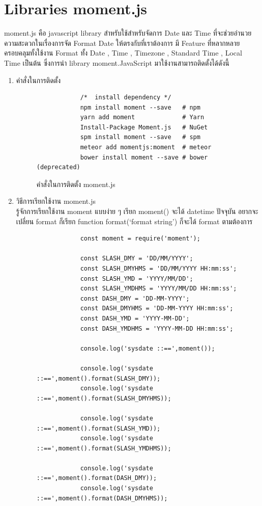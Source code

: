 \section{Libraries moment.js}
moment.js คือ javascript library สำหรับใช้สำหรับจัดการ Date และ Time ที่จะช่วยอำนวยความสะดวกในเรื่องการจัด Format Date ให้ตรงกับที่เราต้องการ
มี Feature ที่หลากหลายครอบคลุมทั้งใช้งาน Format ทั้ง Date , Time , Timezone , Standard Time , Local Time เป็นต้น ซึ่งการนำ library moment.JavaScript 
มาใช้งานสามารถติดตั้งได้ดังนี้
\begin{enumerate}
	\item คำสั่งในการติดตั้ง
	\begin{figure}[H]
		{\begin{lstlisting}
			/*  install dependency */
			npm install moment --save   # npm
			yarn add moment             # Yarn
			Install-Package Moment.js   # NuGet
			spm install moment --save   # spm
			meteor add momentjs:moment  # meteor
			bower install moment --save # bower (deprecated)
		\end{lstlisting}}
	\centering
		\caption{คำสั่งในการติดตั้ง moment.js}
		\label{Fig:API Web Speech}
	\end{figure}
	\item วิธีการเรียกใช้งาน moment.js \\ รู้จักการเรียกใช้งาน moment แบบง่าย ๆ เรียก moment() จะได้ datetime ปัจจุบัน อยากจะเปลี่ยน format ก็เรียก function format(‘format string’) ก็จะได้ format ตามต้องการ
	\begin{figure}[H]
		{\begin{lstlisting}
			const moment = require('moment');

			const SLASH_DMY = 'DD/MM/YYYY';
			const SLASH_DMYHMS = 'DD/MM/YYYY HH:mm:ss';
			const SLASH_YMD = 'YYYY/MM/DD';
			const SLASH_YMDHMS = 'YYYY/MM/DD HH:mm:ss';
			const DASH_DMY = 'DD-MM-YYYY';
			const DASH_DMYHMS = 'DD-MM-YYYY HH:mm:ss';
			const DASH_YMD = 'YYYY-MM-DD';
			const DASH_YMDHMS = 'YYYY-MM-DD HH:mm:ss';
			
			console.log('sysdate ::==',moment());
			
			console.log('sysdate ::==',moment().format(SLASH_DMY));
			console.log('sysdate ::==',moment().format(SLASH_DMYHMS));
			
			console.log('sysdate ::==',moment().format(SLASH_YMD));
			console.log('sysdate ::==',moment().format(SLASH_YMDHMS));
			
			console.log('sysdate ::==',moment().format(DASH_DMY));
			console.log('sysdate ::==',moment().format(DASH_DMYHMS));
			

\end{lstlisting}}
\end{figure}
\end{enumerate}
